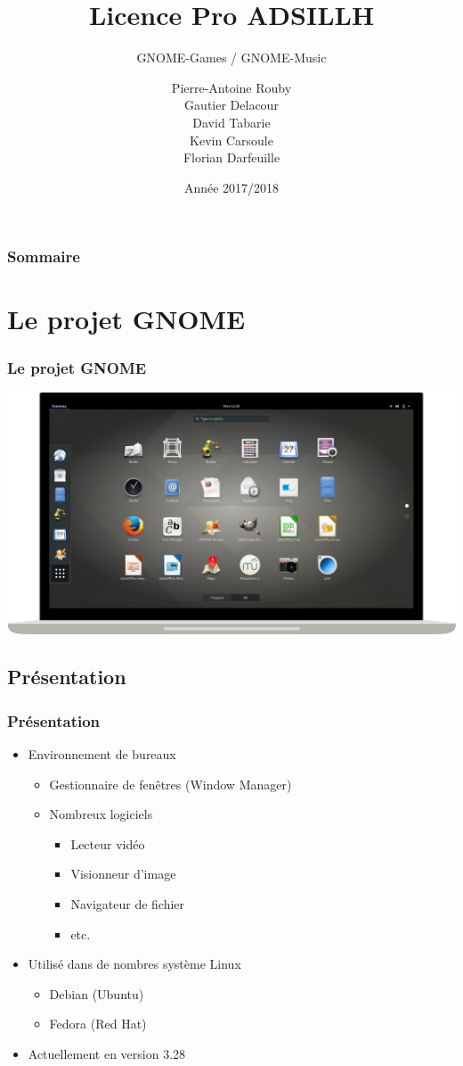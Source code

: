 \documentclass{beamer}
\title{Licence Pro ADSILLH}
\subtitle{GNOME-Games / GNOME-Music}
\author{Pierre-Antoine Rouby\\Gautier Delacour\\
  David Tabarie\\Kevin Carsoule\\Florian Darfeuille}
\date{Année 2017/2018}
\begin{document}
\frame{\titlepage}

\begin{frame}
  \frametitle{Sommaire}
  \tableofcontents
\end{frame}

\section{Le projet GNOME}
\begin{frame}
  \frametitle{Le projet GNOME}
  \includegraphics[scale=0.2]{images/GnomeScreen.png}
\end{frame}

\subsection{Présentation}
\begin{frame}
  \frametitle{Présentation}
  \begin{itemize}
  \item Environnement de bureaux
    \begin{itemize}
    \item Gestionnaire de fenêtres (Window Manager)
    \item Nombreux logiciels
      \begin{itemize} %
      \item Lecteur vidéo
      \item Visionneur d'image
      \item Navigateur de fichier
      \item etc.
      \end{itemize}
    \end{itemize}
  \item Utilisé dans de nombres système Linux
    \begin{itemize}
    \item Debian (Ubuntu)
    \item Fedora (Red Hat)
    \end{itemize}
  \item Actuellement en version 3.28
  \end{itemize}
\end{frame}
\end{document}
